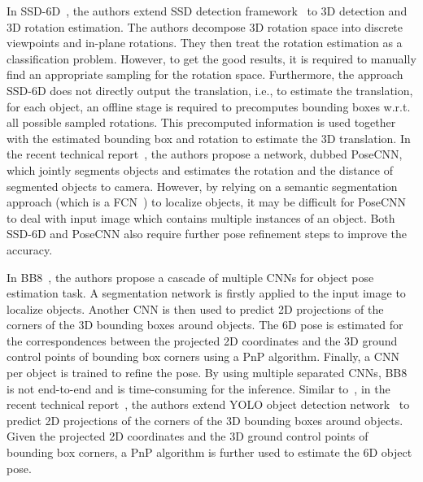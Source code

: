 \documentclass[conference]{IEEEtran}
\begin{document}
In SSD-6D~\cite{SSD-6D}, the authors extend SSD detection framework~\cite{SSD} to 3D detection and 3D rotation estimation. The authors decompose 3D rotation space into discrete viewpoints and in-plane rotations. They then treat the rotation estimation as a classification problem. %
However, to get the good results, it is required to manually find an appropriate sampling for the rotation space. Furthermore, the approach SSD-6D does not directly output the translation, i.e., to estimate  the translation, for each object, an offline stage is required to precomputes bounding boxes w.r.t. all possible sampled rotations. This precomputed information is used together with the estimated bounding box and rotation to estimate the 3D translation. 
In the recent technical report~\cite{posecnn}, the authors propose a network, dubbed PoseCNN, which jointly segments objects and estimates the rotation and the distance of segmented objects to camera. However, by relying on a semantic segmentation approach (which is a FCN~\cite{FCN}) to localize objects, it may be difficult for PoseCNN to deal with input image which contains multiple instances of an object. 
Both SSD-6D and PoseCNN also require further pose refinement steps to improve the accuracy. 

In BB8~\cite{BB8}, the authors propose a cascade of multiple CNNs for object pose estimation task. A segmentation network is firstly applied to the input image to localize objects. Another CNN is then used to predict 2D projections of the corners of the 3D bounding boxes around objects. The 6D pose is estimated for the correspondences between the projected 2D coordinates and the 3D ground control points of 
bounding box corners using a PnP algorithm. Finally, a CNN per object is trained to refine the pose. By using multiple separated CNNs, BB8 is not end-to-end and is time-consuming for the inference. %
Similar to~\cite{BB8}, in the recent technical report~\cite{yolo-6D}, the authors extend YOLO object detection network~\cite{yolo9000} to predict 2D projections of the corners of the 3D bounding boxes around objects. Given the projected 2D coordinates and the 3D ground control points of bounding box corners, a PnP algorithm is further used to estimate the 6D object pose.  
\end{document}
